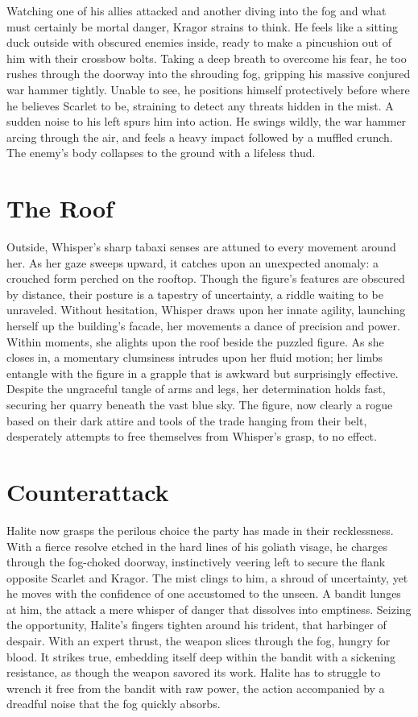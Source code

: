 \documentclass[
  letterpaper,12pt,twoside,twocolumn,openany,
  nodeprecatedcode,bg=full]{dndbook}
\begin{document}
Watching one of his allies attacked and another diving into the fog and
what must certainly be mortal danger, Kragor strains to think. He feels
like a sitting duck outside with obscured enemies inside, ready to make
a pincushion out of him with their crossbow bolts. Taking a deep breath
to overcome his fear, he too rushes through the doorway into the
shrouding fog, gripping his massive conjured war hammer tightly. Unable
to see, he positions himself protectively before where he believes
Scarlet to be, straining to detect any threats hidden in the mist. A
sudden noise to his left spurs him into action. He swings wildly, the
war hammer arcing through the air, and feels a heavy impact followed by
a muffled crunch. The enemy's body collapses to the ground with a
lifeless thud.

\section{The Roof}\label{the-roof}

Outside, Whisper's sharp tabaxi senses are attuned to every movement
around her. As her gaze sweeps upward, it catches upon an unexpected
anomaly: a crouched form perched on the rooftop. Though the figure's
features are obscured by distance, their posture is a tapestry of
uncertainty, a riddle waiting to be unraveled. Without hesitation,
Whisper draws upon her innate agility, launching herself up the
building's facade, her movements a dance of precision and power. Within
moments, she alights upon the roof beside the puzzled figure. As she
closes in, a momentary clumsiness intrudes upon her fluid motion; her
limbs entangle with the figure in a grapple that is awkward but
surprisingly effective. Despite the ungraceful tangle of arms and legs,
her determination holds fast, securing her quarry beneath the vast blue
sky. The figure, now clearly a rogue based on their dark attire and
tools of the trade hanging from their belt, desperately attempts to free
themselves from Whisper's grasp, to no effect.

\section{Counterattack}\label{counterattack}

Halite now grasps the perilous choice the party has made in their
recklessness. With a fierce resolve etched in the hard lines of his
goliath visage, he charges through the fog-choked doorway, instinctively
veering left to secure the flank opposite Scarlet and Kragor. The mist
clings to him, a shroud of uncertainty, yet he moves with the confidence
of one accustomed to the unseen. A bandit lunges at him, the attack a
mere whisper of danger that dissolves into emptiness. Seizing the
opportunity, Halite's fingers tighten around his trident, that harbinger
of despair. With an expert thrust, the weapon slices through the fog,
hungry for blood. It strikes true, embedding itself deep within the
bandit with a sickening resistance, as though the weapon savored its
work. Halite has to struggle to wrench it free from the bandit with raw
power, the action accompanied by a dreadful noise that the fog quickly
absorbs.
\end{document}
